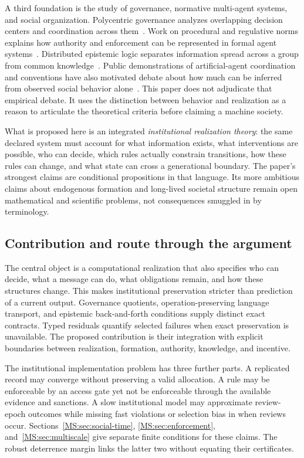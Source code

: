 A third foundation is the study of governance, normative multi-agent systems, and social organization. Polycentric governance analyzes overlapping decision centers and coordination across them~\cite{MS:ostrom,MS:ostrombook}. Work on procedural and regulative norms explains how authority and enforcement can be represented in formal agent systems~\cite{MS:boella,MS:grossinorm}. Distributed epistemic logic separates information spread across a group from common knowledge~\cite{MS:halpernmoses}. Public demonstrations of artificial-agent coordination and conventions have also motivated debate about how much can be inferred from observed social behavior alone~\cite{MS:park,MS:ashery,MS:barrie,MS:asheryreply}. This paper does not adjudicate that empirical debate. It uses the distinction between behavior and realization as a reason to articulate the theoretical criteria before claiming a machine society.

What is proposed here is an integrated \emph{institutional realization theory}: the same declared system must account for what information exists, what interventions are possible, who can decide, which rules actually constrain transitions, how these rules can change, and what state can cross a generational boundary. The paper's strongest claims are conditional propositions in that language. Its more ambitious claims about endogenous formation and long-lived societal structure remain open mathematical and scientific problems, not consequences smuggled in by terminology.

\subsection{Contribution and route through the argument}
The central object is a computational realization that also specifies who can decide, what a message can do, what obligations remain, and how these structures change. This makes institutional preservation stricter than prediction of a current output. Governance quotients, operation-preserving language transport, and epistemic back-and-forth conditions supply distinct exact contracts. Typed residuals quantify selected failures when exact preservation is unavailable. The proposed contribution is their integration with explicit boundaries between realization, formation, authority, knowledge, and incentive.

The institutional implementation problem has three further parts. A replicated record may converge without preserving a valid allocation. A rule may be enforceable by an access gate yet not be enforceable through the available evidence and sanctions. A slow institutional model may approximate review-epoch outcomes while missing fast violations or selection bias in when reviews occur. Sections~\ref{MS:sec:social-time}, \ref{MS:sec:enforcement}, and~\ref{MS:sec:multiscale} give separate finite conditions for these claims. The robust deterrence margin links the latter two without equating their certificates.

